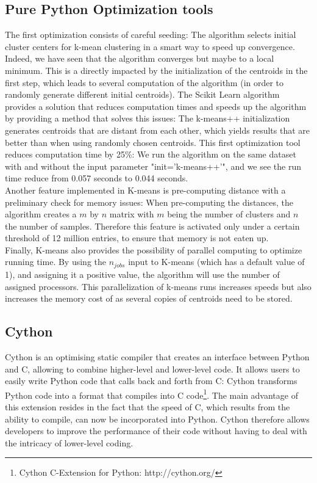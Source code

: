 \documentclass[11pt]{article}
\begin{document}
\subsection*{Pure Python Optimization tools}
The first optimization consists of careful seeding: The algorithm selects initial cluster centers for k-mean clustering in a smart way to speed up convergence.\\

\noindent Indeed, we have seen that the algorithm converges but maybe to a local minimum. This is a directly impacted by the initialization of the centroids in the first step, which leads to several computation of the algorithm (in order to randomly generate different initial centroids). The Scikit Learn algorithm provides a solution that reduces computation times and speeds up the algorithm by providing a method that solves this issues: The k-means++ initialization generates centroids that are distant from each other, which yields results that are better than when using randomly chosen centroids. This first optimization tool reduces computation time by 25\%: We run the algorithm on the same dataset with and without the input parameter "init='k-means++'", and we see the run time reduce from 0.057 seconds to 0.044 seconds. \\

\noindent Another feature implemented in K-means is pre-computing distance with a preliminary check for memory issues: When pre-computing the distances, the algorithm creates a $m$ by $n$ matrix with $m$ being the number of clusters and $n$ the number of samples. Therefore this feature is activated only under a certain threshold of 12 million entries, to ensure that memory is not eaten up.\\

\noindent Finally, K-means also provides the possibility of parallel computing to optimize running time. By using the $n_{jobs}$ input to K-means (which has a default value of 1), and assigning it a positive value, the algorithm will use the number of assigned processors. This parallelization of k-means runs increases speeds but also increases the memory cost of as several copies of centroids need to be stored. 

\subsection*{Cython}
Cython is an optimising static compiler that creates an interface between Python and C, allowing to combine higher-level and lower-level code. It allows users to easily write Python code that calls back and forth from C: Cython transforms Python code into a format that compiles into C code\footnote{Cython C-Extension for Python: http://cython.org/}. The main advantage of this extension resides in the fact that the speed of C, which results from the ability to compile, can now be incorporated into Python. Cython therefore allows developers to improve the performance of their code without having to deal with the intricacy of lower-level coding. \\ 
\end{document}
